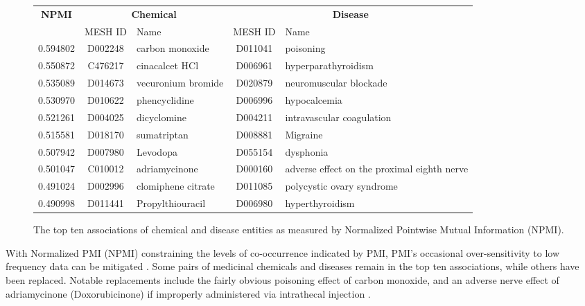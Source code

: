 \documentclass[10pt, oneside]{article}
\begin{document}
\begin{figure}[h]
\begin{center}
\fontsize{9}{11}\selectfont
\begin{tabular}{|*{2}{c|}p{4.5cm}|c|p{4.5cm}|}\hline
 \multirow{2}{*}{\textbf{NPMI}} & \multicolumn{2}{c|}{\textbf{Chemical}} & \multicolumn{2}{c|}{\textbf{Disease}} \\ \cline{2-5}
  & MESH ID   & Name                      & MESH ID   & Name                         \\ \hline 
 0.594802 & D002248   & carbon monoxide    & D011041   & poisoning                                   \\ \hline
 0.550872 & C476217   & cinacalcet HCl     & D006961   & hyperparathyroidism                         \\ \hline
 0.535089 & D014673   & vecuronium bromide & D020879   & neuromuscular blockade                      \\ \hline
 0.530970 & D010622   & phencyclidine      & D006996   & hypocalcemia                                \\ \hline
 0.521261 & D004025   & dicyclomine        & D004211   & intravascular coagulation                   \\ \hline
 0.515581 & D018170   & sumatriptan        & D008881   & Migraine                                    \\ \hline
 0.507942 & D007980   & Levodopa           & D055154   & dysphonia                                   \\ \hline
 0.501047 & C010012   & adriamycinone      & D000160   & adverse effect on the proximal eighth nerve \\ \hline
 0.491024 & D002996   & clomiphene citrate & D011085   & polycystic ovary syndrome                   \\ \hline
 0.490998 & D011441   & Propylthiouracil   & D006980   & hyperthyroidism                             \\ \hline
\end{tabular}
\caption{\label{fig:npmi} The top ten associations of chemical and disease entities as measured by Normalized Pointwise Mutual Information (NPMI).}
\end{center}
\end{figure}

With Normalized PMI (NPMI) constraining the levels of co-occurrence indicated by PMI, PMI's occasional over-sensitivity to low frequency data can be mitigated \cite{bouma2009normalized}. Some pairs of medicinal chemicals and diseases remain in the top ten associations, while others have been replaced. Notable replacements include the fairly obvious poisoning effect of carbon monoxide, and an adverse nerve effect of adriamycinone (Doxorubicinone) if improperly administered via intrathecal injection \cite[ch. 55]{kompoliti2007drug}.
\end{document}

